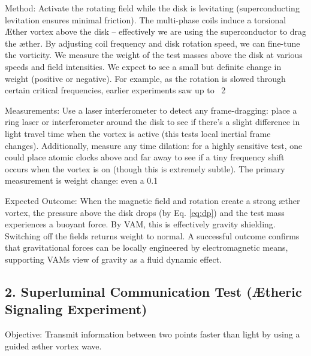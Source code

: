 Method: Activate the rotating field while the disk is levitating (superconducting levitation ensures minimal friction). The multi-phase coils induce a torsional Æther vortex above the disk – effectively we are using the superconductor to drag the æther. By adjusting coil frequency and disk rotation speed, we can fine-tune the vorticity. We measure the weight of the test masses above the disk at various speeds and field intensities. We expect to see a small but definite change in weight (positive or negative). For example, as the rotation is slowed through certain critical frequencies, earlier experiments saw up to ~2%


Measurements: Use a laser interferometer to detect any frame-dragging: place a ring laser or interferometer around the disk to see if there's a slight difference in light travel time when the vortex is active (this tests local inertial frame changes). Additionally, measure any time dilation: for a highly sensitive test, one could place atomic clocks above and far away to see if a tiny frequency shift occurs when the vortex is on (though this is extremely subtle). The primary measurement is weight change: even a 0.1%


Expected Outcome: When the magnetic field and rotation create a strong æther vortex, the pressure above the disk drops (by Eq. \eqref{eq:dp}) and the test mass experiences a buoyant force. By VAM, this is effectively gravity shielding. Switching off the fields returns weight to normal. A successful outcome confirms that gravitational forces can be locally engineered by electromagnetic means, supporting VAM\rqs s view of gravity as a fluid dynamic effect.


\subsection*{2. Superluminal Communication Test (Ætheric Signaling Experiment)}

Objective: Transmit information between two points faster than light by using a guided æther vortex wave.


